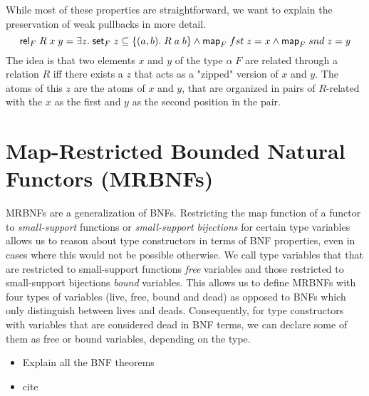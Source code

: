     While most of these properties are straightforward, we want to explain the preservation of weak pullbacks in more detail.
    \begin{equation}
      \text{\textsf{rel}}_F\; R\; x\; y = \exists z.\; \text{\textsf{set}}_F\; z \subseteq \{(a, b).\; R\; a\; b \} \land 
        \text{\textsf{map}}_F\; fst\; z = x \land \text{\textsf{map}}_F\; snd\; z = y \label{eq:WP}
    \end{equation}
    The idea is that two elements $x$ and $y$ of the type $\alpha\; F$ are related through a relation $R$ iff there exists a $z$ that acts as a "zipped" version of $x$ and $y$. The atoms of this $z$ are the atoms of $x$ and $y$, that are organized in pairs of $R$-related with the $x$ as the first and $y$ as the second position in the pair.

  \section{Map-Restricted Bounded Natural Functors (MRBNFs)}
    \acp{MRBNF} are a generalization of \acp{BNF}. Restricting the \textsf{map} function of a functor to \textit{small-support} functions or \textit{small-support bijections} for certain type variables allows us to reason about type constructors in terms of \ac{BNF} properties, even in cases where this would not be possible otherwise. We call type variables that that are restricted to small-support functions \textit{free} variables  and those restricted to small-support bijections \textit{bound} variables. This allows us to define \acp{MRBNF} with four types of variables (live, free, bound and dead) as opposed to \acp{BNF} which only distinguish between lives and deads. 
    Consequently, for type constructors with variables that are considered dead in \ac{BNF} terms, we can declare some of them as free or bound variables, depending on the type.

    
  \begin{itemize}
    \item Explain all the BNF theorems
    \item cite \cite{blanchette2019bindings}
  \end{itemize}

